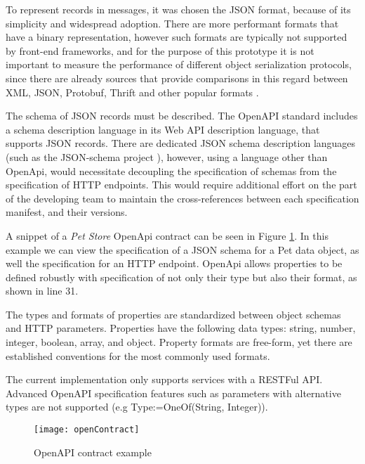 To represent records in messages, it was chosen the JSON format, because of its simplicity and widespread adoption.
There are more performant formats that have a binary representation,
however such formats are typically not supported by front-end frameworks, and for the purpose of this prototype
it is not important to measure the performance of different object serialization protocols, since
there are already sources that provide comparisons in this regard between XML, JSON, Protobuf, Thrift and other popular formats \cite{serializationBenchmark}.

The schema of JSON records must be described.
The OpenAPI standard includes a schema description language in its Web API description language, that supports JSON records.
There are dedicated JSON schema description languages (such as the JSON-schema project \cite{jsonschema}), however,
using a language other than OpenApi, would necessitate decoupling the specification of schemas from the specification of HTTP endpoints.
This would require additional effort on the part of the developing team to maintain the cross-references
between each specification manifest, and their versions.

A snippet of a \textit{Pet Store} OpenApi contract can be seen in Figure \ref{fig:open_contract}.
In this example we can view the specification of a JSON schema for a Pet data object,
as well the specification for an HTTP endpoint.
OpenApi allows properties to be defined robustly with specification of not only their type but also their format, as shown in line 31.

The types and formats of properties are standardized between object schemas and HTTP parameters.
Properties have the following data types: string, number, integer, boolean, array, and object.
Property formats are free-form, yet there are established conventions for the most commonly used formats.

The current implementation only supports services with a RESTFul API.
Advanced OpenAPI specification features such as parameters with alternative types are not supported (e.g Type:=OneOf(String, Integer)).

\begin{figure}[htbp]
    \centering
    \centerline{\texttt{[image: openContract]}}
    \caption{OpenAPI contract example}
    \label{fig:open_contract}
\end{figure}

\newpage


